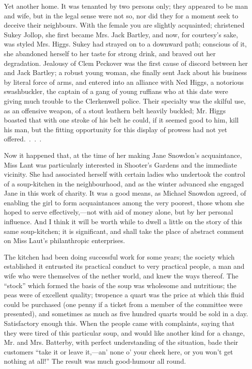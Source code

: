 Yet another home. It was tenanted by two persons only; they appeared to
be man and wife, but in the legal sense were not so, nor did they for a
moment seek to deceive their neighbours. With the female you are
slightly acquainted; christened Sukey Jollop, she first became Mrs. Jack
Bartley, and now, for courtesy's sake, was styled Mrs. Higgs. Sukey had
strayed on to a downward path; conscious of it, she abandoned herself to
her taste for strong drink, and braved out her degradation. Jealousy of
Clem Peckover was the first cause of discord between her and Jack
Bartley; a robust young woman, she finally sent Jack about his business
by literal force of arms, and entered into an alliance with Ned Higgs, a
notorious swashbuckler, the captain of a gang of young ruffians who at
this date were giving much trouble to the Clerkenwell police. Their
specialty was the skilful use, as an offensive weapon, of a stout
leathern belt heavily buckled; Mr. Higgs boasted that with one stroke of
his belt he could, if it seemed good {}to him, kill his man, but the
fitting opportunity for this display of prowess had not yet
offered{.~.~.~.}

Now it happened that, at the time of her making Jane Snowdon's
acquaintance, Miss Lant was particularly interested in Shooter's Gardens
and the immediate vicinity. She had associated herself with certain
ladies who undertook the control of a soup-kitchen in the neighbourhood,
and as the winter advanced she engaged Jane in this work of charity. It
was a good means, as Michael Snowdon agreed, of enabling the girl to
form acquaintances among the very poorest, those whom she hoped to serve
effectively,---not with aid of money alone, but by her personal
influence. And I think it will be worth while to dwell a little on the
story of this same soup-kitchen; it is significant, and shall take the
place of abstract comment on Miss Laut's philanthropic enterprises.

The kitchen had been doing successful work for some years; the society
which established it entrusted its practical conduct to very practical
people, a man and wife who were themselves of the nether world, and knew
the ways {}thereof. The ``stock'' which formed the basis of the soup was
wholesome and nutritious; the peas were of excellent quality; twopence a
quart was the price at which this fluid could be purchased (one penny if
a ticket from a member of the committee were presented), and sometimes
as much as five hundred quarts would be sold in a day. Satisfactory
enough this. When the people came with complaints, saying that they were
tired of this particular soup, and would like another kind for a change,
Mr. and Mrs. Batterby, with perfect understanding of the situation, bade
their customers ``take it or leave it,---an' none o' your cheek here, or
you won't get nothing at all!'' The result was much good-humour all
round.

